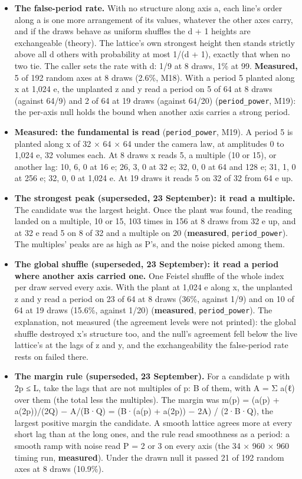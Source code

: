 \begin{itemize}
\item \textbf{The false-period rate.} With no structure along axis a, each line's order along a is one more arrangement of its values, whatever the other axes carry, and if the draws behave as uniform shuffles the d + 1 heights are exchangeable (theory). The lattice's own strongest height then stands strictly above all d others with probability at most 1/(d + 1), exactly that when no two tie. The caller sets the rate with d: 1/9 at 8 draws, 1\% at 99. \textbf{Measured,} 5 of 192 random axes at 8 draws (2.6\%, M18). With a period 5 planted along x at 1,024 e, the unplanted z and y read a period on 5 of 64 at 8 draws (against 64/9) and 2 of 64 at 19 draws (against 64/20) (\texttt{period\_\allowbreak{}power}, M19): the per-axis null holds the bound when another axis carries a strong period.
\item \textbf{Measured: the fundamental is read} (\texttt{period\_\allowbreak{}power}, M19). A period 5 is planted along x of 32 × 64 × 64 under the camera law, at amplitudes 0 to 1,024 e, 32 volumes each. At 8 draws x reads 5, a multiple (10 or 15), or another lag: 10, 6, 0 at 16 e; 26, 3, 0 at 32 e; 32, 0, 0 at 64 and 128 e; 31, 1, 0 at 256 e; 32, 0, 0 at 1,024 e. At 19 draws it reads 5 on 32 of 32 from 64 e up.
\item \textbf{The strongest peak (superseded, 23 September): it read a multiple.} The candidate was the largest height. Once the plant was found, the reading landed on a multiple, 10 or 15, 103 times in 156 at 8 draws from 32 e up, and at 32 e read 5 on 8 of 32 and a multiple on 20 (\textbf{measured}, \texttt{period\_\allowbreak{}power}). The multiples' peaks are as high as P's, and the noise picked among them.
\item \textbf{The global shuffle (superseded, 23 September): it read a period where another axis carried one.} One Feistel shuffle of the whole index per draw served every axis. With the plant at 1,024 e along x, the unplanted z and y read a period on 23 of 64 at 8 draws (36\%, against 1/9) and on 10 of 64 at 19 draws (15.6\%, against 1/20) (\textbf{measured}, \texttt{period\_\allowbreak{}power}). The explanation, not measured (the agreement levels were not printed): the global shuffle destroyed x's structure too, and the null's agreement fell below the live lattice's at the lags of z and y, and the exchangeability the false-period rate rests on failed there.
\item \textbf{The margin rule (superseded, 23 September).} For a candidate p with 2p ≤ L, take the lags that are not multiples of p: B of them, with A = Σ a(ℓ) over them (the total less the multiples). The margin was m(p) = (a(p) + a(2p))/(2Q) − A/(B·Q) = (B·(a(p) + a(2p)) − 2A) / (2·B·Q), the largest positive margin the candidate. A smooth lattice agrees more at every short lag than at the long ones, and the rule read smoothness as a period: a smooth ramp with noise read P = 2 or 3 on every axis (the 34 × 960 × 960 timing run, \textbf{measured}). Under the drawn null it passed 21 of 192 random axes at 8 draws (10.9\%).

\end{itemize}
